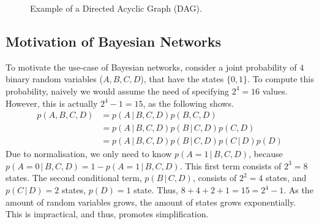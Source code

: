 \documentclass{article}
\begin{document}
\begin{figure}[H]
    \begin{center}
    \end{center}
    \caption{Example of a Directed Acyclic Graph (DAG).}
    \label{fig:DAG_example}
\end{figure}


\subsection{Motivation of Bayesian Networks}
To motivate the use-case of Bayesian networks, consider a joint probability of $4$ binary random variables ($A, B, C, D$), that have the states $\{0, 1\}$. To compute this probability, naively we would assume the need of specifying $2^4 = 16$ values. However, this is actually $2^4 - 1 = 15$, as the following shows. 
\begin{align*}
    p(A, B, C, D) &= p(A \,|\, B, C, D)p(B, C, D)\\
    &= p(A \,|\, B, C, D)p(B \,|\, C, D)p(C, D)\\
    &= p(A \,|\, B, C, D)p(B \,|\, C, D)p(C\,|\, D) p(D)
\end{align*}
Due to normalisation, we only need to know $p(A = 1\,|\, B, C, D)$, because $p(A = 0\,|\, B, C, D) = 1 - p(A = 1\,|\, B, C, D)$. This first term consists of $2^3 = 8$ states. The second conditional term, $p(B \,|\, C, D)$, consists of $2^2 = 4$ states, and $p(C\,|\,D) = 2$ states, $p(D) = 1$ state. Thus, $8+4+2+1 = 15 = 2^4 - 1$. As the amount of random variables grows, the amount of states grows exponentially. This is impractical, and thus, promotes simplification.
\end{document}
